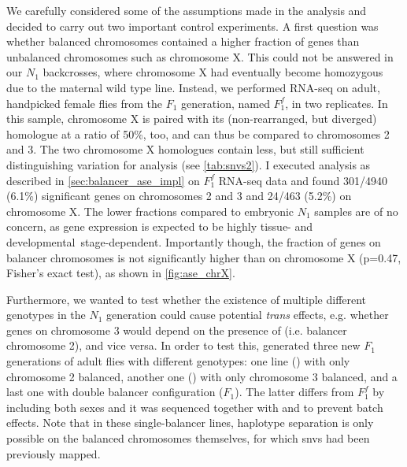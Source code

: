 We carefully considered some of the assumptions made in the \ase analysis and
decided to carry out two important control experiments. A first question was
whether balanced chromosomes contained a higher fraction of \ase genes than
unbalanced chromosomes such as chromosome X. This could not be answered in our
$N_1$ backcrosses, where chromosome X had eventually become homozygous due to the
maternal wild type line.
Instead, we performed RNA-seq on adult, handpicked
female flies from the $F_1$ generation, named $F_1^f$, in two
replicates. In this sample, chromosome X is paired with its (non-rearranged,
but diverged) homologue at a ratio of 50\%, too, and can thus be compared to
chromosomes 2 and 3. The two chromosome X homologues contain less, but still
sufficient distinguishing variation for \ase analysis (see \cref{tab:snvs2}).
I executed \ase analysis as described in \cref{sec:balancer_ase_impl} on $F_1^f$
RNA-seq data and found 301/4940 (6.1\%) significant \ase genes on chromosomes
2 and 3 and 24/463 (5.2\%) on chromosome X. The lower fractions compared to
embryonic $N_1$ samples are of no concern, as gene expression is expected to
be highly tissue- and developmental\ stage-dependent. Importantly though, the
fraction of \ase genes on balancer chromosomes is not significantly higher than
on chromosome X (p=0.47, Fisher’s exact test), as shown in \cref{fig:ase_chrX}.

Furthermore, we wanted to test whether the existence of multiple different
genotypes in the $N_1$ generation could cause potential \textit{trans} effects,
e.g. whether genes on chromosome 3 would depend on the presence of \cyo
(i.e. balancer chromosome 2), and vice versa. In order to test this, \yad generated
three new $F_1$ generations of adult flies with different genotypes: one line
(\Fcyo) with only chromosome 2 balanced, another one (\Ftm) with only
chromosome 3 balanced, and a last one with double balancer configuration ($F_1$).
The latter differs from $F_1^f$ by including both sexes and it was sequenced
together with \Fcyo and \Ftm to prevent batch effects. Note that
in these single-balancer lines, haplotype separation is only
possible on the balanced chromosomes themselves, for which \acp{snv} had been
previously mapped.


